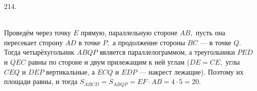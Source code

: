 214. \begin{figure}[ht!]
\end{figure}\\
Проведём через точку $E$ прямую, параллельную стороне $AB,$ пусть она пересекает сторону $AD$ в точке $P,$ а продолжение стороны $BC$ --- в точке $Q.$ Тогда четырёхугольник $ABQP$ является параллелограммом, а треугольники $PED$ и $QEC$ равны по стороне и двум прилежащим к ней углам ($DE=CE,$ углы $CEQ$ и $DEP$ вертикальные, а $ECQ$ и $EDP$ --- накрест лежащие). Поэтому их площади равны, и тогда $S_{ABCD}=S_{ABQP}=EF\cdot AB=4\cdot5=20.$\newpage\noindent
